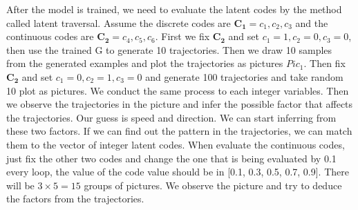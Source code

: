 After the model is trained, we need to evaluate the latent codes by the method called latent traversal. Assume the discrete codes are \(\mathbf{C_1} = c_1, c_2, c_3\) and the continuous codes are  \(\mathbf{C_2}= c_4, c_5, c_6\). First we fix \(\mathbf{C_2}\) and set \(c_1 = 1, c_2 = 0, c_3=0\), then use the trained G to generate 10 trajectories. Then we draw 10 samples from the generated examples and plot the trajectories as pictures \(Pic_1\). Then fix \(\mathbf{C_2}\) and set \(c_1=0, c_2 = 1, c_3 = 0\) and generate 100 trajectories and take random 10 plot as pictures. We conduct the same process to each integer variables. Then we observe the trajectories in the picture and infer the possible factor that affects the trajectories. Our guess is speed and direction. We can start inferring  from these two factors. If we can find out the pattern in the trajectories, we can match them to the vector of integer latent codes. When evaluate the continuous codes, just fix the other two codes and change the one that is being evaluated by 0.1 every loop, the value of the code value should be in [0.1, 0.3, 0.5, 0.7, 0.9]. There will be \(3 \times 5 = 15\) groups of pictures. We observe the picture and try to deduce the factors from the trajectories.